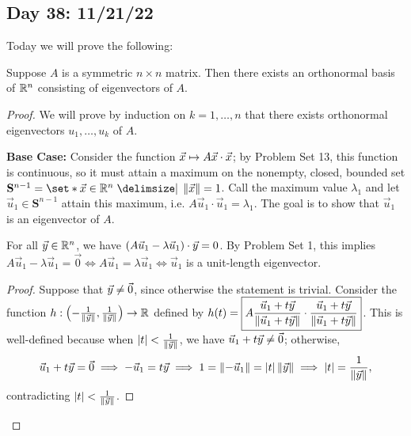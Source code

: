 \documentclass[main.tex]{subfiles}
\begin{document}
\subsection{Day 38: 11/21/22}
Today we will prove the following:
\begin{theorem}
    Suppose $A$ is a symmetric $n\times n$ matrix. Then there exists an orthonormal basis of $\mathbb R^n$ consisting of eigenvectors of $A$.
\end{theorem}

\begin{proof}
    We will prove by induction on $k = 1, \ldots , n$ that there exists orthonormal eigenvectors $u_1, \ldots , u_k$ of $A$.

    \textbf{Base Case:} Consider the function $\vec{x} \mapsto A\vec{x}\cdot\vec{x}$; by Problem Set 13, this function is continuous, so it must attain a maximum on the nonempty, closed, bounded set $\mathbf{S}^{n - 1} = \set*{\vx\in \RR^n \mid \norm{\vx} = 1}$. Call the maximum value $\lambda_1$ and let $\vec{u}_1 \in \mathbf{S}^{n - 1}$ attain this maximum, i.e. $A\vec{u}_1\cdot\vec{u}_1 = \lambda_1$. The goal is to show that $\vec{u}_1$ is an eigenvector of $A$.

    \begin{claim}
        For all $\vec{y}\in \mathbb R^n$, we have $\left( A\vec{u}_1 - \lambda\vec{u}_1 \right) \cdot \vec{y} = 0$. By Problem Set 1, this implies $A\vec{u}_1 - \lambda\vec{u}_1 = \vec{0}\iff A\vec{u}_1 = \lambda\vec{u}_1\iff \vec{u}_1$ is a unit-length eigenvector.
    \end{claim}

    \begin{proof}
        Suppose that $\vec{y} \neq \vec{0}$, since otherwise the statement is trivial. Consider the function $h : \left( -\frac{1}{\left\lVert \vec{y} \right\rVert}, \frac{1}{\left\lVert \vec{y} \right\rVert} \right)\to \mathbb R$ defined by $h(t) = \boxed{A\frac{\vec{u}_1 + t\vec{y}}{\left\lVert \vec{u}_1 + t\vec{y} \right\rVert} \cdot \frac{\vec{u}_1 + t\vec{y}}{\left\lVert \vec{u}_1 + t\vec{y} \right\rVert}}$. This is well-defined because when $\left\lvert t \right\rvert < \frac{1}{\left\lVert \vec{y} \right\rVert}$, we have $\vec{u}_1 + t\vec{y} \neq \vec{0}$; otherwise,
        \[\vec{u}_1 + t\vec{y} = \vec{0}\implies -\vec{u}_1 = t\vec{y} \implies 1 = \left\lVert -\vec{u}_1 \right\rVert = \left\lvert t \right\rvert\left\lVert \vec{y} \right\rVert\implies \left\lvert t \right\rvert = \frac{1}{\left\lVert \vec{y} \right\rVert},\]
        contradicting $\left\lvert t \right\rvert < \frac{1}{\left\lVert \vec{y} \right\rVert}$.


\end{proof}
\end{proof}
\end{document}
